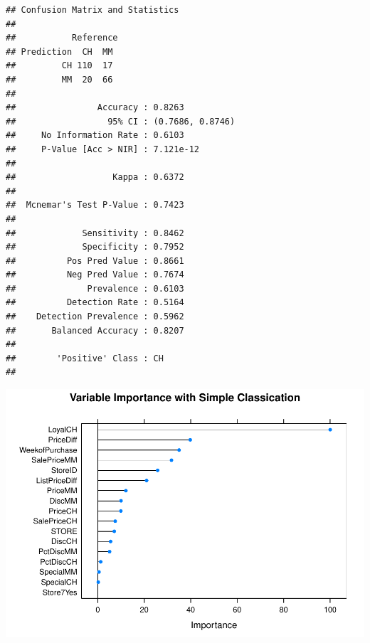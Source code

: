 \documentclass[
]{book}
\newenvironment{Shaded}{\begin{snugshade}}{\end{snugshade}}
\newcommand{\CommentTok}[1]{\textcolor[rgb]{0.56,0.35,0.01}{\textit{#1}}}
\newcommand{\DataTypeTok}[1]{\textcolor[rgb]{0.13,0.29,0.53}{#1}}
\newcommand{\DecValTok}[1]{\textcolor[rgb]{0.00,0.00,0.81}{#1}}
\newcommand{\KeywordTok}[1]{\textcolor[rgb]{0.13,0.29,0.53}{\textbf{#1}}}
\newcommand{\NormalTok}[1]{#1}
\newcommand{\OperatorTok}[1]{\textcolor[rgb]{0.81,0.36,0.00}{\textbf{#1}}}
\newcommand{\StringTok}[1]{\textcolor[rgb]{0.31,0.60,0.02}{#1}}
\begin{document}
\begin{verbatim}
## Confusion Matrix and Statistics
## 
##           Reference
## Prediction  CH  MM
##         CH 110  17
##         MM  20  66
##                                           
##                Accuracy : 0.8263          
##                  95% CI : (0.7686, 0.8746)
##     No Information Rate : 0.6103          
##     P-Value [Acc > NIR] : 7.121e-12       
##                                           
##                   Kappa : 0.6372          
##                                           
##  Mcnemar's Test P-Value : 0.7423          
##                                           
##             Sensitivity : 0.8462          
##             Specificity : 0.7952          
##          Pos Pred Value : 0.8661          
##          Neg Pred Value : 0.7674          
##              Prevalence : 0.6103          
##          Detection Rate : 0.5164          
##    Detection Prevalence : 0.5962          
##       Balanced Accuracy : 0.8207          
##                                           
##        'Positive' Class : CH              
## 
\end{verbatim}

\begin{Shaded}
\end{Shaded}

\includegraphics{data-sci_files/figure-latex/unnamed-chunk-105-2.pdf}
\end{document}
